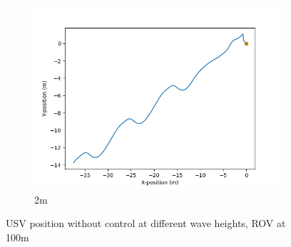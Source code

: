 \documentclass[class=article, crop=false]{standalone}
\begin{document}
\begin{figure}
\begin{subfigure}[b]{0.48\textwidth}
        \includegraphics{scenario1/rov-100m/2.0m/usv_position_uncontrolled}
        \caption{2m}
        \label{}
    \end{subfigure}

    \caption{USV position without control at different wave heights, ROV at 100m}
\end{figure}
\FloatBarrier
\end{document}
